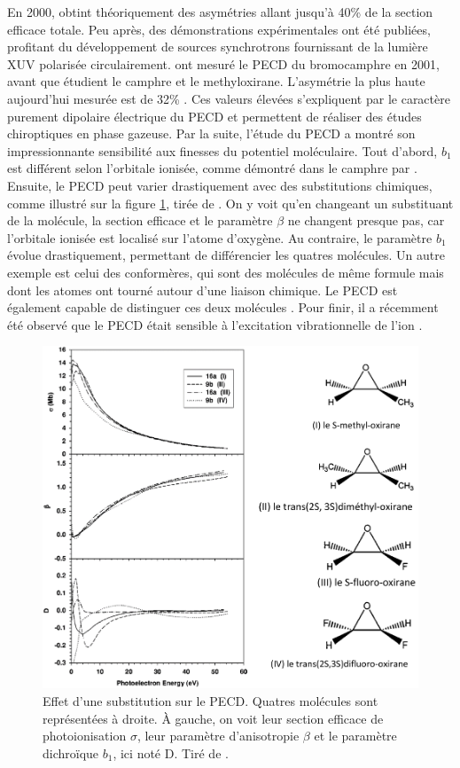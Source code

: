 En 2000,  obtint théoriquement des asymétries allant jusqu'à 40\% de la section efficace totale. Peu après, des démonstrations expérimentales ont été publiées, profitant du développement de sources synchrotrons fournissant de la lumière XUV polarisée circulairement.  ont mesuré le PECD du bromocamphre en 2001, avant que  étudient le camphre et  le methyloxirane. L'asymétrie la plus haute aujourd'hui mesurée est de 32\% . Ces valeurs élevées s'expliquent par le caractère purement dipolaire électrique du PECD et permettent de réaliser des études chiroptiques en phase gazeuse.
Par la suite, l'étude du PECD a montré son impressionnante sensibilité aux finesses du potentiel moléculaire. Tout d'abord, $b_1$ est différent selon l'orbitale ionisée, comme démontré dans le camphre par . Ensuite, le PECD peut varier drastiquement avec des substitutions chimiques, comme illustré sur la figure \ref{fig:substitution}, tirée de . On y voit qu'en changeant un substituant de la molécule, la section efficace et le paramètre $\beta$ ne changent presque pas, car l'orbitale ionisée est localisé sur l'atome d'oxygène. Au contraire, le paramètre $b_1$ évolue drastiquement, permettant de différencier les quatres molécules. Un autre exemple est celui des conformères, qui sont des molécules de même formule mais dont les atomes ont tourné autour d'une liaison chimique. Le PECD est également capable de distinguer ces deux molécules . Pour finir, il a récemment été observé que le PECD était sensible à l'excitation vibrationnelle de l'ion .

\begin{figure}[!ht]
\centering
\includegraphics[width=.7\columnwidth]{Figures/PECD/substitution.png}%
\caption{Effet d'une substitution sur le PECD. Quatres molécules sont représentées à droite. \`A gauche, on voit leur section efficace de photoionisation $\sigma$, leur paramètre d'anisotropie $\beta$ et le paramètre dichroïque $b_1$, ici noté D. Tiré de .}
\label{fig:substitution}
\end{figure}

